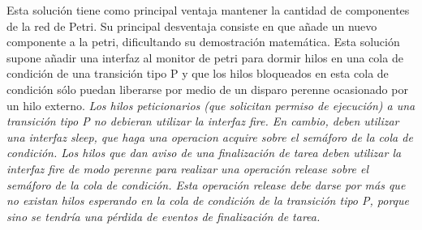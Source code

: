 Esta solución tiene como principal ventaja mantener la cantidad de componentes
de la red de Petri.
Su principal desventaja consiste en que añade un nuevo componente a la
petri, dificultando su demostración matemática. Esta solución supone añadir una
interfaz al monitor de petri para dormir hilos en una cola de condición de una
transición tipo P y que los hilos bloqueados en esta cola de condición sólo
puedan liberarse por medio de un disparo perenne ocasionado por un hilo externo.
\emph{\color{red} Los hilos peticionarios (que solicitan permiso de ejecución)
a una transición tipo P no debieran utilizar la interfaz fire. En cambio, deben
utilizar una interfaz sleep, que haga una operacion acquire sobre el semáforo
de la cola de condición.
Los hilos que dan aviso de una finalización de tarea deben utilizar la interfaz
fire de modo perenne para realizar una operación release sobre el semáforo de
la cola de condición. Esta operación release debe darse por más que no existan
hilos esperando en la cola de condición de la transición tipo P, porque sino se
tendría una pérdida de eventos de finalización de tarea.}

